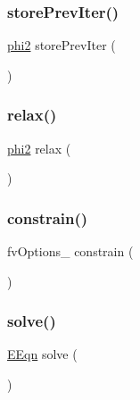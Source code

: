 \subsubsection{\texorpdfstring{store\+Prev\+Iter()}{storePrevIter()}}
{\footnotesize\ttfamily \hyperlink{refsAndControls__2p_8H_adb57687d5d74249f550cb14883eebe4d}{phi2} store\+Prev\+Iter (\begin{DoxyParamCaption}{ }\end{DoxyParamCaption})}

\mbox{\label{EEqn__1p_8H_ada060d6619956dc9185abaefdb79b7d0}} 
\subsubsection{\texorpdfstring{relax()}{relax()}}
{\footnotesize\ttfamily \hyperlink{refsAndControls__2p_8H_adb57687d5d74249f550cb14883eebe4d}{phi2} relax (\begin{DoxyParamCaption}{ }\end{DoxyParamCaption})}

\mbox{\label{EEqn__1p_8H_ada92f4bf542de36f5c56f50ac3bd22da}} 
\subsubsection{\texorpdfstring{constrain()}{constrain()}}
{\footnotesize\ttfamily fv\+Options\+\_\+ constrain (\begin{DoxyParamCaption}\item[{\hyperlink{EEqn__1pl_8H_afbe3b0df5936ee9102f8bea26f93e95a}{E\+Eqn}}]{ }\end{DoxyParamCaption})}

\mbox{\label{EEqn__1p_8H_ac123867940006fb14e8346d9bdc38f8d}} 
\subsubsection{\texorpdfstring{solve()}{solve()}}
{\footnotesize\ttfamily \hyperlink{EEqn__1pl_8H_afbe3b0df5936ee9102f8bea26f93e95a}{E\+Eqn} solve (\begin{DoxyParamCaption}{ }\end{DoxyParamCaption})}

